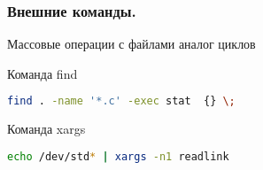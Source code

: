 \begin{frame}[fragile]
\frametitle{Внешние команды.}
Массовые операции с файлами аналог циклов
  \begin{block}{Команда find}
    \begin{lstlisting}[language=sh,frame=single]
find . -name '*.c' -exec stat  {} \;
    \end{lstlisting}
  \end{block}
  \begin{block}{Команда xargs}
    \begin{lstlisting}[language=sh,frame=single]
echo /dev/std* | xargs -n1 readlink
    \end{lstlisting}
  \end{block}
\end{frame}
